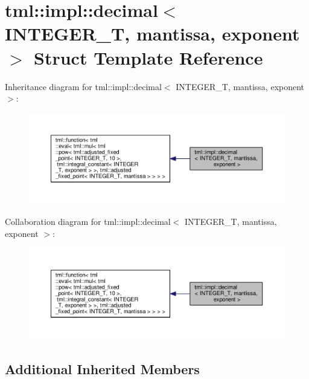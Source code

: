 \hypertarget{structtml_1_1impl_1_1decimal}{\section{tml\+:\+:impl\+:\+:decimal$<$ I\+N\+T\+E\+G\+E\+R\+\_\+\+T, mantissa, exponent $>$ Struct Template Reference}
\label{structtml_1_1impl_1_1decimal}
}


Inheritance diagram for tml\+:\+:impl\+:\+:decimal$<$ I\+N\+T\+E\+G\+E\+R\+\_\+\+T, mantissa, exponent $>$\+:
\nopagebreak
\begin{figure}[H]
\begin{center}
\leavevmode
\includegraphics[width=350pt]{structtml_1_1impl_1_1decimal__inherit__graph}
\end{center}
\end{figure}


Collaboration diagram for tml\+:\+:impl\+:\+:decimal$<$ I\+N\+T\+E\+G\+E\+R\+\_\+\+T, mantissa, exponent $>$\+:
\nopagebreak
\begin{figure}[H]
\begin{center}
\leavevmode
\includegraphics[width=350pt]{structtml_1_1impl_1_1decimal__coll__graph}
\end{center}
\end{figure}
\subsection*{Additional Inherited Members}


